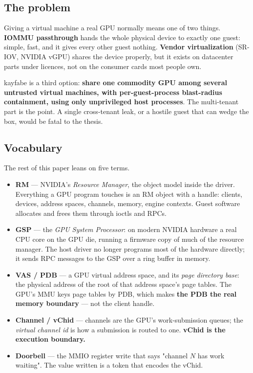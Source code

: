 \documentclass[10.5pt]{article}
\begin{document}
\subsection{The problem}

Giving a virtual machine a real GPU normally means one of two things. \textbf{IOMMU
passthrough} hands the whole physical device to exactly one guest: simple, fast, and it gives
every other guest nothing. \textbf{Vendor virtualization} (SR-IOV, NVIDIA vGPU) shares the
device properly, but it exists on datacenter parts under licences, not on the consumer cards
most people own.

kayfabe is a third option: \textbf{share one commodity GPU among several untrusted virtual
machines, with per-guest-process blast-radius containment, using only unprivileged host
processes}. The multi-tenant part is the point. A single cross-tenant leak, or a hostile guest
that can wedge the box, would be fatal to the thesis.

\subsection{Vocabulary}

The rest of this paper leans on five terms.

\begin{itemize}
\item \textbf{RM} — NVIDIA's \emph{Resource Manager}, the object model inside the driver.
  Everything a GPU program touches is an RM object with a handle: clients, devices, address
  spaces, channels, memory, engine contexts. Guest software allocates and frees them through
  ioctls and RPCs.
\item \textbf{GSP} — the \emph{GPU System Processor}: on modern NVIDIA hardware a real CPU core
  on the GPU die, running a firmware copy of much of the resource manager. The host driver no
  longer programs most of the hardware directly; it sends RPC messages to the GSP over a ring
  buffer in memory.
\item \textbf{VAS / PDB} — a GPU virtual address space, and its \emph{page directory base}: the
  physical address of the root of that address space's page tables. The GPU's MMU keys page
  tables by PDB, which makes \textbf{the PDB the real memory boundary} — not the client handle.
\item \textbf{Channel / vChid} — channels are the GPU's work-submission queues; the
  \emph{virtual channel id} is how a submission is routed to one. \textbf{vChid is the
  execution boundary.}
\item \textbf{Doorbell} — the MMIO register write that says "channel $N$ has work waiting". The
  value written is a token that encodes the vChid.
\end{itemize}
\end{document}
